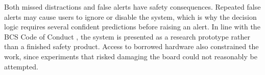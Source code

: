 Both missed distractions and false alerts have safety consequences. Repeated false alerts may cause users to ignore or disable the system, which is why the decision logic requires several confident predictions before raising an alert. In line with the BCS Code of Conduct \citep{bcs2026conduct}, the system is presented as a research prototype rather than a finished safety product. Access to borrowed hardware also constrained the work, since experiments that risked damaging the board could not reasonably be attempted.






